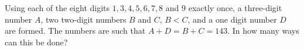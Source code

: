 Using each of the eight digits $1,3,4,5,6,7,8$ and $9$ exactly once, a three-digit number $A$,  two two-digit numbers $B$ and $C$,  $B<C$,  and a one digit number $D$ are formed. The numbers are such that $A+D=B+C=143$. In how many ways can this be done?